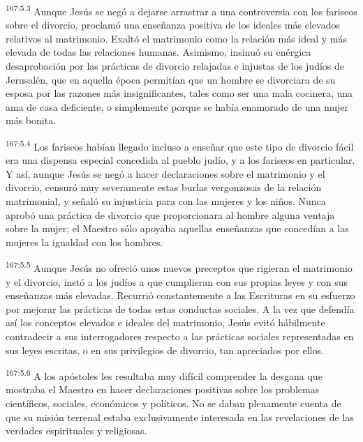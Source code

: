 \par 
\textsuperscript{167:5.3} Aunque Jesús se negó a dejarse arrastrar a una controversia con los fariseos sobre el divorcio, proclamó una enseñanza positiva de los ideales más elevados relativos al matrimonio. Exaltó el matrimonio como la relación más ideal y más elevada de todas las relaciones humanas. Asimismo, insinuó su enérgica desaprobación por las prácticas de divorcio relajadas e injustas de los judíos de Jerusalén, que en aquella época permitían que un hombre se divorciara de su esposa por las razones más insignificantes, tales como ser una mala cocinera, una ama de casa deficiente, o simplemente porque se había enamorado de una mujer más bonita.

\par 
\textsuperscript{167:5.4} Los fariseos habían llegado incluso a enseñar que este tipo de divorcio fácil era una dispensa especial concedida al pueblo judío, y a los fariseos en particular. Y así, aunque Jesús se negó a hacer declaraciones sobre el matrimonio y el divorcio, censuró muy severamente estas burlas vergonzosas de la relación matrimonial, y señaló su injusticia para con las mujeres y los niños. Nunca aprobó una práctica de divorcio que proporcionara al hombre alguna ventaja sobre la mujer; el Maestro sólo apoyaba aquellas enseñanzas que concedían a las mujeres la igualdad con los hombres.

\par 
\textsuperscript{167:5.5} Aunque Jesús no ofreció unos nuevos preceptos que rigieran el matrimonio y el divorcio, instó a los judíos a que cumplieran con sus propias leyes y con sus enseñanzas más elevadas. Recurrió constantemente a las Escrituras en su esfuerzo por mejorar las prácticas de todas estas conductas sociales. A la vez que defendía así los conceptos elevados e ideales del matrimonio, Jesús evitó hábilmente contradecir a sus interrogadores respecto a las prácticas sociales representadas en sus leyes escritas, o en sus privilegios de divorcio, tan apreciados por ellos.

\par 
\textsuperscript{167:5.6} A los apóstoles les resultaba muy difícil comprender la desgana que mostraba el Maestro en hacer declaraciones positivas sobre los problemas científicos, sociales, económicos y políticos. No se daban plenamente cuenta de que su misión terrenal estaba exclusivamente interesada en las revelaciones de las verdades espirituales y religiosas.


